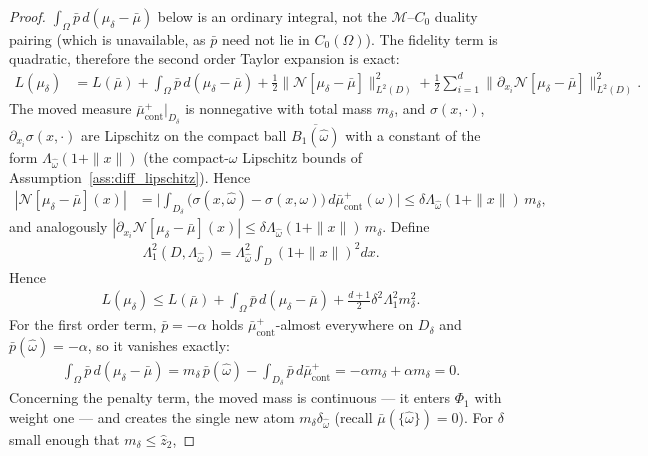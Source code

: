 \documentclass[11pt]{amsart}
\theoremstyle{definition}
\theoremstyle{remark}
\DeclareMathOperator{\cont}{cont}
\begin{document}
\begin{proof}
$\int_\Omega \bar{p}\, d(\mu_\delta - \bar{\mu})$ below is an ordinary integral,
not the $\mathcal{M}$--$C_0$ duality pairing (which is unavailable, as
$\bar{p}$ need not lie in $C_0(\Omega)$).
The fidelity term is quadratic, therefore the second order Taylor expansion is exact:
\begin{align*}
	L(\mu_\delta)  &= L(\bar{\mu}) + \int_\Omega \bar{p}\, d(\mu_\delta - \bar{\mu}) + \frac{1}{2} \|\mathcal{N}[\mu_\delta - \bar{\mu}]\|_{L^2(D)}^2 + \frac{1}{2}\sum_{i = 1}^d \|\partial_{x_i} \mathcal{N}[\mu_\delta - \bar{\mu}]\|_{L^2(D)}^2 .
\end{align*}
The moved measure $\bar{\mu}^+_{\cont}|_{D_\delta}$ is nonnegative with total
mass $m_\delta$, and $\sigma(x, \cdot)$, $\partial_{x_i}\sigma(x, \cdot)$ are
Lipschitz on the compact ball $\overline{B_1(\hat{\omega})}$ with a constant of
the form $\Lambda_{\hat{\omega}} (1 + \|x\|)$ (the compact-$\omega$ Lipschitz
bounds of Assumption~\ref{ass:diff_lipschitz}). Hence
\begin{align*}
	 |\mathcal{N}[\mu_\delta - \bar{\mu}](x)| &= \bigg|\int_{D_\delta} \big( \sigma(x, \hat{\omega}) - \sigma(x, \omega) \big) \, d\bar{\mu}^+_{\cont}(\omega) \bigg|
	 \le \delta \Lambda_{\hat{\omega}} (1 + \|x\|)\, m_\delta,
\end{align*}
and analogously
$|\partial_{x_i} \mathcal{N}[\mu_\delta - \bar{\mu}](x)| \le \delta \Lambda_{\hat{\omega}} (1 + \|x\|)\, m_\delta$.
Define
\begin{align*}
	\Lambda_1^2(D, \Lambda_{\hat{\omega}}) =  \Lambda_{\hat{\omega}}^2 \int_D(1 + \|x\|)^2 dx .
\end{align*}
Hence
\begin{align*}
	L(\mu_\delta) \le L(\bar{\mu}) + \int_\Omega \bar{p}\, d(\mu_\delta - \bar{\mu}) + \frac{d + 1}{2}\delta^2 \Lambda_1^2 m_\delta^2.
\end{align*}
For the first order term, $\bar{p} = -\alpha$ holds
$\bar{\mu}^+_{\cont}$-almost everywhere on $D_\delta$ and
$\bar{p}(\hat{\omega}) = -\alpha$, so it vanishes exactly:
\begin{align*}
	\int_\Omega \bar{p}\, d(\mu_\delta - \bar{\mu})
	= m_\delta \, \bar{p}(\hat{\omega}) - \int_{D_\delta} \bar{p} \, d\bar{\mu}^+_{\cont}
	= -\alpha m_\delta + \alpha m_\delta = 0.
\end{align*}
Concerning the penalty term, the moved mass is continuous --- it enters
$\Phi_1$ with weight one --- and creates the single new atom
$m_\delta \delta_{\hat{\omega}}$ (recall $\bar{\mu}(\{\hat{\omega}\}) = 0$).
For $\delta$ small enough that $m_\delta \le \hat{z}_2$,

\end{proof}
\end{document}
